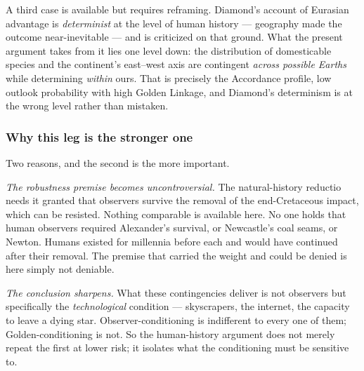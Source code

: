 \documentclass[11pt]{article}
\numberwithin{equation}{section}
\theoremstyle{plain}
\theoremstyle{definition}
\theoremstyle{remark}
\begin{document}
A third case is available but requires reframing. Diamond's account of
Eurasian advantage \cite{Diamond97} is \emph{determinist} at the level
of human history --- geography made the outcome near-inevitable --- and
is criticized on that ground. What the present argument takes from it
lies one level down: the distribution of domesticable species and the
continent's east--west axis are contingent \emph{across possible
Earths} while determining \emph{within} ours. That is precisely the
Accordance profile, low outlook probability with high Golden Linkage,
and Diamond's determinism is at the wrong level rather than mistaken.

\subsubsection{Why this leg is the stronger one}
\label{gc:subsub:strongerleg}

Two reasons, and the second is the more important.

\emph{The robustness premise becomes uncontroversial.} The natural-history
reductio needs it granted that observers survive the removal of the
end-Cretaceous impact, which can be resisted. Nothing comparable is
available here. No one holds that human observers required Alexander's
survival, or Newcastle's coal seams, or Newton. Humans existed for
millennia before each and would have continued after their removal. The
premise that carried the weight and could be denied is here simply not
deniable.

\emph{The conclusion sharpens.} What these contingencies deliver is not
observers but specifically the \emph{technological} condition ---
skyscrapers, the internet, the capacity to leave a dying star.
Observer-conditioning is indifferent to every one of them;
Golden-conditioning is not. So the human-history argument does not merely repeat
the first at lower risk; it isolates what the conditioning must be
sensitive to.
\end{document}
